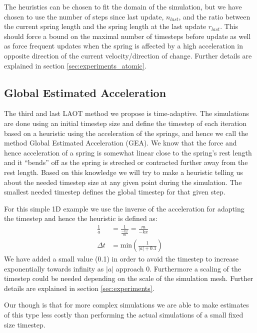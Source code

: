 \documentclass[11pt]{article}
\providecommand{\abs}[1]{\left \lvert #1 \right \rvert}
\begin{document}
The heuristics can be chosen to fit the domain of the simulation, but we have
chosen to use the number of steps since last update, $n_{last}$, and the ratio
between the current spring length and the spring length at the last update
$r_{last}$. This should force a bound on the maximal number of timesteps
before update as well as force frequent updates when the spring is affected by a
high acceleration in opposite direction of the current velocity/direction of
change.  Further details are explained in
section \ref{sec:experiments_atomic}.

\subsection{Global Estimated Acceleration}
The third and last LAOT method we propose is time-adaptive. The simulations are
done using an initial timestep size and define the timestep of each iteration
based on a heuristic using the acceleration of the springs, and hence we call
the method Global Estimated Acceleration (GEA). We know that the force and hence
acceleration of a spring is somewhat linear close to the spring's rest length
and it ``bends'' off as the spring is streched or contracted further away from
the rest length. Based on this knowledge we will try to make a heuristic
telling us about the needed timestep size at any given point during the
simulation. The smallest needed timestep defines the global timestep for that
given step.

For this simple 1D example we use the inverse of the acceleration
for adapting the timestep and hence the heuristic is defined as:
\begin{align}
    \frac{1}{a} &= \frac{1}{\frac{-kx}{m}} = \frac{m}{-kx} \\
    \label{eq:inverse}
    \Delta t &= \text{min}\left( \frac{1}{\abs{a} + 0.1} \right )
\end{align}
We have added a small value (0.1) in order to avoid the timestep to increase
exponentially towards infinity as $\abs{a}$ approach 0. Furthermore a scaling
of the timestep could be needed depending on the scale of the simulation mesh.
Further details are explained in section \ref{sec:experiments}.

Our though is that for more
complex simulations we are able to make estimates of this type less costly than
performing the actual simulations of a small fixed size timestep.

\end{document}
